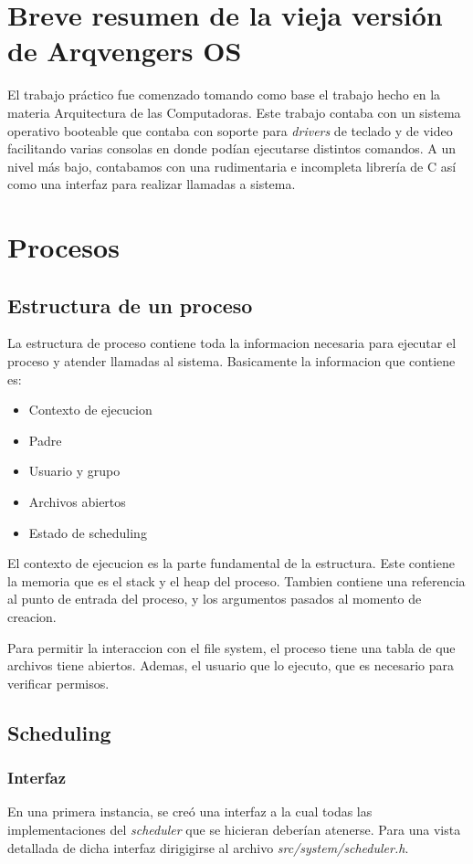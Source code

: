 \documentclass[a4paper,10pt]{article}
\begin{document}
\newpage
\section{Breve resumen de la vieja versión de Arqvengers OS}
El trabajo práctico fue comenzado tomando como base el trabajo hecho en la materia Arquitectura de las Computadoras.
 Este trabajo contaba con un sistema operativo booteable que contaba con soporte para \textit{drivers} de
  teclado y de video facilitando varias consolas en donde podían ejecutarse distintos comandos. 
  A un nivel más bajo, contabamos con una rudimentaria e incompleta librería de C así como una interfaz para realizar
  llamadas a sistema.
\newpage
\section{Procesos}

\subsection{Estructura de un proceso}
La estructura de proceso contiene toda la informacion necesaria para ejecutar el proceso y atender llamadas al sistema.
Basicamente la informacion que contiene es:
\begin{itemize}
\item Contexto de ejecucion
\item Padre
\item Usuario y grupo
\item Archivos abiertos
\item Estado de scheduling
\end{itemize}

El contexto de ejecucion es la parte fundamental de la estructura.
Este contiene la memoria que es el stack y el heap del proceso.
Tambien contiene una referencia al punto de entrada del proceso, y los argumentos pasados al momento de creacion.

Para permitir la interaccion con el file system, el proceso tiene una tabla de que archivos tiene abiertos.
Ademas, el usuario que lo ejecuto, que es necesario para verificar permisos.

    \subsection{Scheduling}
        
        \subsubsection{Interfaz}
        En una primera instancia, se creó una interfaz a la cual todas las implementaciones del \textit{scheduler} que se hicieran
	deberían atenerse. Para una vista detallada de dicha interfaz dirigigirse al archivo \textit{src/system/scheduler.h}.
\end{document}
